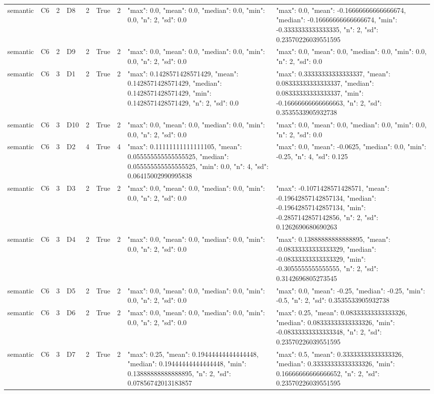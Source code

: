 \begin{tabular}{lllllllll}
semantic & C6 & 2 & D8 & 2 & True & 2 & {"max": 0.0, "mean": 0.0, "median": 0.0, "min": 0.0, "n": 2, "sd": 0.0} & {"max": 0.0, "mean": -0.16666666666666674, "median": -0.16666666666666674, "min": -0.3333333333333335, "n": 2, "sd": 0.23570226039551595} \\
semantic & C6 & 2 & D9 & 2 & True & 2 & {"max": 0.0, "mean": 0.0, "median": 0.0, "min": 0.0, "n": 2, "sd": 0.0} & {"max": 0.0, "mean": 0.0, "median": 0.0, "min": 0.0, "n": 2, "sd": 0.0} \\
semantic & C6 & 3 & D1 & 2 & True & 2 & {"max": 0.1428571428571429, "mean": 0.1428571428571429, "median": 0.1428571428571429, "min": 0.1428571428571429, "n": 2, "sd": 0.0} & {"max": 0.33333333333333337, "mean": 0.08333333333333337, "median": 0.08333333333333337, "min": -0.16666666666666663, "n": 2, "sd": 0.3535533905932738} \\
semantic & C6 & 3 & D10 & 2 & True & 2 & {"max": 0.0, "mean": 0.0, "median": 0.0, "min": 0.0, "n": 2, "sd": 0.0} & {"max": 0.0, "mean": 0.0, "median": 0.0, "min": 0.0, "n": 2, "sd": 0.0} \\
semantic & C6 & 3 & D2 & 4 & True & 4 & {"max": 0.11111111111111105, "mean": 0.055555555555555525, "median": 0.055555555555555525, "min": 0.0, "n": 4, "sd": 0.06415002990995838} & {"max": 0.0, "mean": -0.0625, "median": 0.0, "min": -0.25, "n": 4, "sd": 0.125} \\
semantic & C6 & 3 & D3 & 2 & True & 2 & {"max": 0.0, "mean": 0.0, "median": 0.0, "min": 0.0, "n": 2, "sd": 0.0} & {"max": -0.1071428571428571, "mean": -0.19642857142857134, "median": -0.19642857142857134, "min": -0.2857142857142856, "n": 2, "sd": 0.1262690680690263} \\
semantic & C6 & 3 & D4 & 2 & True & 2 & {"max": 0.0, "mean": 0.0, "median": 0.0, "min": 0.0, "n": 2, "sd": 0.0} & {"max": 0.13888888888888895, "mean": -0.08333333333333329, "median": -0.08333333333333329, "min": -0.3055555555555555, "n": 2, "sd": 0.3142696805273545} \\
semantic & C6 & 3 & D5 & 2 & True & 2 & {"max": 0.0, "mean": 0.0, "median": 0.0, "min": 0.0, "n": 2, "sd": 0.0} & {"max": 0.0, "mean": -0.25, "median": -0.25, "min": -0.5, "n": 2, "sd": 0.3535533905932738} \\
semantic & C6 & 3 & D6 & 2 & True & 2 & {"max": 0.0, "mean": 0.0, "median": 0.0, "min": 0.0, "n": 2, "sd": 0.0} & {"max": 0.25, "mean": 0.08333333333333326, "median": 0.08333333333333326, "min": -0.08333333333333348, "n": 2, "sd": 0.23570226039551595} \\
semantic & C6 & 3 & D7 & 2 & True & 2 & {"max": 0.25, "mean": 0.19444444444444448, "median": 0.19444444444444448, "min": 0.13888888888888895, "n": 2, "sd": 0.07856742013183857} & {"max": 0.5, "mean": 0.33333333333333326, "median": 0.33333333333333326, "min": 0.16666666666666652, "n": 2, "sd": 0.23570226039551595} \\

\end{tabular}
